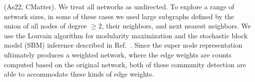 (As22, CMatter). We treat all networks as undirected. To explore a range of network sizes, in some of these cases we used large subgraphs defined by the union of all nodes of degree $\geq 2$, their neighbors, and next nearest neighbors. We use the Louvain algorithm\cite{traaglouvain}
for modularity maximization \cite{blondel} and the stochastic block model (SBM) inference\cite{tiagoskewed}
described in Ref.~. Since the super node representation ultimately produces a weighted network, where the edge weights are counts computed based on the original network, both of these community detection are able to accommodate these kinds of edge weights. 

